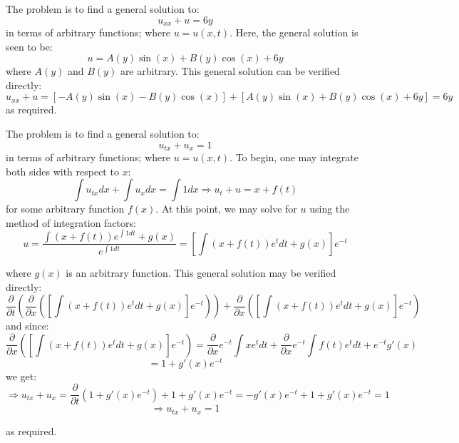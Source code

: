 \begin{homeworkProblem}
The problem is to find a general solution to:
\[
u_{xx}  + u = 6y
\]
in terms of arbitrary functions; where $u=u(x,t)$.
Here, the general solution is seen to be:
\[
u = A\left( y \right)\sin \left( x \right) + B\left( y \right)\cos \left( x \right) + 6y
\]
where $A(y)$ and $B(y)$ are arbitrary. This general solution can be verified directly:
\[
u_{xx}  + u = \left[ { - A\left( y \right)\sin \left( x \right) - B\left( y \right)\cos \left( x \right)} \right] + \left[ {A\left( y \right)\sin \left( x \right) + B\left( y \right)\cos \left( x \right) + 6y} \right] = 6y
\]
as required.
\end{homeworkProblem}
\begin{homeworkProblem}
The problem is to find a general solution to:
\[
u_{tx}  + u_x  = 1
\]
in terms of arbitrary functions; where $u=u(x,t)$. To begin, one may integrate both sides with respect to $x$:
\[
\int {u_{tx} dx}  + \int {u_x dx}  = \int {1dx}  \Rightarrow u_t  + u = x + f\left( t \right)
\]
for some arbitrary function $f(x)$. At this point, we may solve for $u$ using the method of integration factors:
\[
u = \frac{{\int {\left( {x + f\left( t \right)} \right)e^{\int {1dt} }  + g\left( x \right)} }}
{{e^{\int {1dt} } }} = \left[ {\int {\left( {x + f\left( t \right)} \right)e^t dt + g\left( x \right)} } \right]e^{ - t} 
\]

where $g(x)$ is an arbitrary function. This general solution may be verified directly:
\[
\frac{\partial }
{{\partial t}}\left( {\frac{\partial }
{{\partial x}}\left( {\left[ {\int {\left( {x + f\left( t \right)} \right)e^t dt + g\left( x \right)} } \right]e^{ - t} } \right)} \right) + \frac{\partial }
{{\partial x}}\left( {\left[ {\int {\left( {x + f\left( t \right)} \right)e^t dt + g\left( x \right)} } \right]e^{ - t} } \right)
\]
and since:
\[
\frac{\partial }
{{\partial x}}\left( {\left[ {\int {\left( {x + f\left( t \right)} \right)e^t dt + g\left( x \right)} } \right]e^{ - t} } \right) = \frac{\partial }
{{\partial x}}e^{ - t} \int {xe^t dt}  + \frac{\partial }
{{\partial x}}e^{ - t} \int {f\left( t \right)e^t dt}  + e^{ - t} g'\left( x \right)
\]
\[
 = 1 + g'\left( x \right)e^{ - t} 
\]
we get:
\[
 \Rightarrow u_{tx}  + u_x  = \frac{\partial }
{{\partial t}}\left( {1 + g'\left( x \right)e^{ - t} } \right) + 1 + g'\left( x \right)e^{ - t}  =  - g'\left( x \right)e^{ - t}  + 1 + g'\left( x \right)e^{ - t}  = 1
\]
\[
 \Rightarrow u_{tx}  + u_x  = 1
\]

as required.
\end{homeworkProblem}
